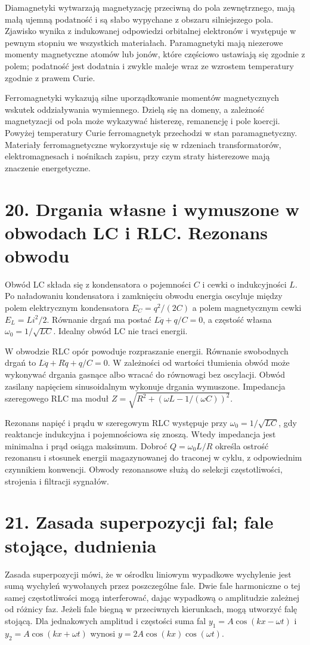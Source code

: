 \documentclass[11pt,a4paper,oneside]{report}
\begin{document}
Diamagnetyki wytwarzają magnetyzację przeciwną do pola zewnętrznego, mają małą ujemną podatność i są słabo wypychane z obszaru silniejszego pola. Zjawisko wynika z indukowanej odpowiedzi orbitalnej elektronów i występuje w pewnym stopniu we wszystkich materiałach. Paramagnetyki mają niezerowe momenty magnetyczne atomów lub jonów, które częściowo ustawiają się zgodnie z polem; podatność jest dodatnia i zwykle maleje wraz ze wzrostem temperatury zgodnie z prawem Curie.

Ferromagnetyki wykazują silne uporządkowanie momentów magnetycznych wskutek oddziaływania wymiennego. Dzielą się na domeny, a zależność magnetyzacji od pola może wykazywać histerezę, remanencję i pole koercji. Powyżej temperatury Curie ferromagnetyk przechodzi w stan paramagnetyczny. Materiały ferromagnetyczne wykorzystuje się w rdzeniach transformatorów, elektromagnesach i nośnikach zapisu, przy czym straty histerezowe mają znaczenie energetyczne.

\section{20. Drgania własne i wymuszone w obwodach LC i RLC. Rezonans obwodu}
Obwód LC składa się z kondensatora o pojemności \(C\) i cewki o indukcyjności \(L\). Po naładowaniu kondensatora i zamknięciu obwodu energia oscyluje między polem elektrycznym kondensatora \(E_C=q^2/(2C)\) a polem magnetycznym cewki \(E_L=Li^2/2\). Równanie drgań ma postać \(L\ddot q+q/C=0\), a częstość własna \(\omega_0=1/\sqrt{LC}\). Idealny obwód LC nie traci energii.

W obwodzie RLC opór powoduje rozpraszanie energii. Równanie swobodnych drgań to \(L\ddot q+R\dot q+q/C=0\). W zależności od wartości tłumienia obwód może wykonywać drgania gasnące albo wracać do równowagi bez oscylacji. Obwód zasilany napięciem sinusoidalnym wykonuje drgania wymuszone. Impedancja szeregowego RLC ma moduł \(Z=\sqrt{R^2+(\omega L-1/(\omega C))^2}\).

Rezonans napięć i prądu w szeregowym RLC występuje przy \(\omega_0=1/\sqrt{LC}\), gdy reaktancje indukcyjna i pojemnościowa się znoszą. Wtedy impedancja jest minimalna i prąd osiąga maksimum. Dobroć \(Q=\omega_0L/R\) określa ostrość rezonansu i stosunek energii magazynowanej do traconej w cyklu, z odpowiednim czynnikiem konwencji. Obwody rezonansowe służą do selekcji częstotliwości, strojenia i filtracji sygnałów.

\section{21. Zasada superpozycji fal; fale stojące, dudnienia}
Zasada superpozycji mówi, że w ośrodku liniowym wypadkowe wychylenie jest sumą wychyleń wywołanych przez poszczególne fale. Dwie fale harmoniczne o tej samej częstotliwości mogą interferować, dając wypadkową o amplitudzie zależnej od różnicy faz. Jeżeli fale biegną w przeciwnych kierunkach, mogą utworzyć falę stojącą. Dla jednakowych amplitud i częstości suma fal \(y_1=A\cos(kx-\omega t)\) i \(y_2=A\cos(kx+\omega t)\) wynosi \(y=2A\cos(kx)\cos(\omega t)\).
\end{document}
